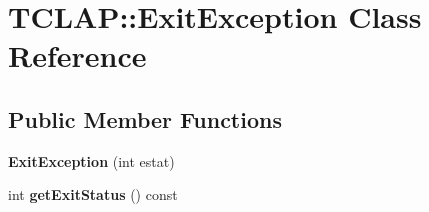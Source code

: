 \hypertarget{class_t_c_l_a_p_1_1_exit_exception}{\section{T\+C\+L\+A\+P\+:\+:Exit\+Exception Class Reference}
\label{class_t_c_l_a_p_1_1_exit_exception}
}
\subsection*{Public Member Functions}
\begin{DoxyCompactItemize}
\item 
\hypertarget{class_t_c_l_a_p_1_1_exit_exception_a03a48ed9da416c8261edbd9cbbf85b27}{{\bfseries Exit\+Exception} (int estat)}\label{class_t_c_l_a_p_1_1_exit_exception_a03a48ed9da416c8261edbd9cbbf85b27}

\item 
\hypertarget{class_t_c_l_a_p_1_1_exit_exception_acf7fd20c9cfb67b5718031ed0debda1c}{int {\bfseries get\+Exit\+Status} () const }\label{class_t_c_l_a_p_1_1_exit_exception_acf7fd20c9cfb67b5718031ed0debda1c}

\end{DoxyCompactItemize}
